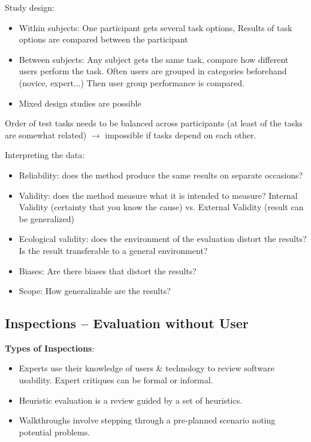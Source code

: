 Study design:
\begin{itemize}
\item Within subjects: One participant gets several task options, Results of task options are compared between the participant
\item Between subjects: Any subject gets the same task, compare how different users perform the task. Often users are grouped in categories beforehand (novice, expert...) Then user group performance is compared.
\item Mixed design studies are possible
\end{itemize}
Order of test tasks needs to be balanced across participants (at least of the tasks are somewhat related) $\rightarrow$ impossible if tasks depend on each other.

Interpreting the data: 
\begin{itemize}
\item Reliability: does the method produce the same results on separate occasions?
\item Validity: does the method measure what it is intended to measure? Internal Validity (certainty that you know the cause) vs. External Validity (result can be generalized)
\item Ecological validity: does the environment of the evaluation distort the results? Is the result transferable to a general environment?
\item Biases: Are there biases that distort the results?
\item Scope: How generalizable are the results?
\end{itemize}

\subsection{Inspections -- Evaluation without User}
\textbf{Types of Inspections}:
\begin{itemize}
\item Experts use their knowledge of users \& technology to review software usability. Expert critiques can be formal or informal.
\item Heuristic evaluation is a review guided by a set of heuristics.
\item Walkthroughs involve stepping through a pre-planned scenario noting potential problems.
\end{itemize}

